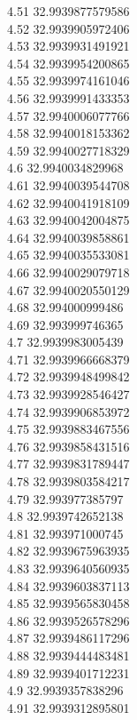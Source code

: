 {4.51	32.9939877579586\\
4.52	32.9939905972406\\
4.53	32.9939931491921\\
4.54	32.9939954200865\\
4.55	32.9939974161046\\
4.56	32.9939991433353\\
4.57	32.9940006077766\\
4.58	32.9940018153362\\
4.59	32.9940027718329\\
4.6	32.9940034829968\\
4.61	32.9940039544708\\
4.62	32.9940041918109\\
4.63	32.9940042004875\\
4.64	32.9940039858861\\
4.65	32.9940035533081\\
4.66	32.9940029079718\\
4.67	32.9940020550129\\
4.68	32.994000999486\\
4.69	32.993999746365\\
4.7	32.9939983005439\\
4.71	32.9939966668379\\
4.72	32.9939948499842\\
4.73	32.9939928546427\\
4.74	32.9939906853972\\
4.75	32.9939883467556\\
4.76	32.9939858431516\\
4.77	32.9939831789447\\
4.78	32.9939803584217\\
4.79	32.993977385797\\
4.8	32.9939742652138\\
4.81	32.993971000745\\
4.82	32.9939675963935\\
4.83	32.9939640560935\\
4.84	32.9939603837113\\
4.85	32.9939565830458\\
4.86	32.9939526578296\\
4.87	32.9939486117296\\
4.88	32.9939444483481\\
4.89	32.9939401712231\\
4.9	32.9939357838296\\
4.91	32.9939312895801\\
}
